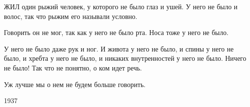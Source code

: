 ЖИЛ один рыжий человек, у которого не было глаз и ушей. У него не было и волос, так что рыжим его называли условно.

Говорить он не мог, так как у него не было рта. Носа тоже у него не было.

У него не было даже рук и ног. И живота у него не было, и спины у него не было, и хребта у него не было, и никаких внутренностей у него не было. Ничего не было! Так что не понятно, о ком идет речь.

Уж лучше мы о нем не будем больше говорить.

1937